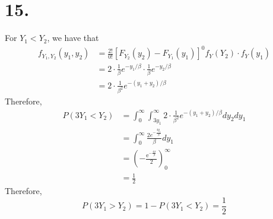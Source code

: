 \documentclass[11pt]{article}
\begin{document}
\section*{15.}
For $Y_1<Y_2$, we have that 
\begin{equation*}
    \begin{aligned}
        f_{Y_1, Y_2}(y_1, y_2) &= \frac{2!}{0!} [F_{Y_2}(y_2) - F_{Y_1}(y_1)]^0 f_Y(Y_2) \cdot f_Y(y_1) \\
        &= 2 \cdot \frac{1}{\beta}e^{-y_1/\beta} \cdot \frac{1}{\beta}e^{-y_2/\beta}  \\
        &= 2 \cdot \frac{1}{\beta^2}e^{-(y_1+y_2)/\beta}
    \end{aligned}
\end{equation*}
Therefore, 
\begin{equation*}
    \begin{aligned}
        P(3Y_1 < Y_2) 
        &= \int_0^\infty \int_{3y_1}^{\infty} 2 \cdot \frac{1}{\beta^2}e^{-(y_1+y_2)/\beta} dy_2 dy_1 \\
        &= \int_0^\infty \frac{2e^{-\frac{4y_1}{\beta}}}{\beta} dy_1 \\
        &= \left(-\frac{\mathrm{e}^{-\frac{4x}{{\beta}}}}{2} \right)^\infty_0 \\
        &= \frac{1}{2}
    \end{aligned}
\end{equation*}
Therefore, 
\[
    P(3Y_1 > Y_2) = 1- P(3Y_1 < Y_2) = \frac{1}{2}    
\]
\end{document}

